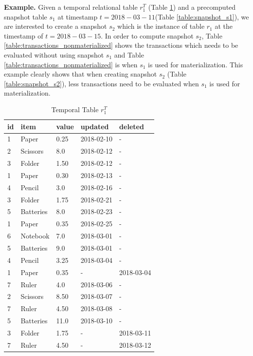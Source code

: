 \textbf{Example.} Given a temporal relational table $r_1^T$ (Table \ref{table:temporal_table_3}) and a precomputed snapshot table $s_1$ at timestamp $t = 2018-03-11$(Table \ref{table:snapshot_s1}), we are interested to create a snapshot $s_2$ which is the instance of table $r_1$ at the timestamp of $t = 2018-03-15$. In order to compute snapshot $s_2$, Table \ref{table:transactions_nonmaterialized} shows the transactions which needs to be evaluated without using snapshot $s_1$ and Table \ref{table:transactions_nonmaterialized} is when $s_1$ is used for materialization. This example clearly shows that when creating snapshot $s_2$ (Table \ref{table:snapshot_s2}), less transactions need to be evaluated when $s_1$ is used for materialization.

\begin{center}
\begin{table}
	\centering
	\caption{Temporal Table $r_1^T$}
	\label {table:temporal_table_3}
	\begin{tabular}{p{1cm}p{2cm}p{3cm}p{3cm}p{2cm}}
		\hline
		id & item & value  & updated  & deleted\\ \hline
		1 & Paper & 0.25  & 2018-02-10  &  - \\  
		2 & Scissors & 8.0  & 2018-02-12  &  - \\
		3 & Folder & 1.50  & 2018-02-12  &  - \\
		1 & Paper & 0.30  & 2018-02-13  &  - \\
		4 & Pencil & 3.0  & 2018-02-16  &  - \\
		3 & Folder & 1.75  & 2018-02-21  &  - \\
		5 & Batteries & 8.0  & 2018-02-23  &  - \\
		1 & Paper & 0.35  & 2018-02-25  &  - \\
		6 & Notebook & 7.0  & 2018-03-01  &  - \\
		5 & Batteries & 9.0  & 2018-03-01  &  - \\
		4 & Pencil & 3.25  & 2018-03-04  &  - \\
		1 & Paper & 0.35  &  - &  2018-03-04 \\
		7 & Ruler & 4.0  & 2018-03-06  &  - \\
		2 & Scissors & 8.50  & 2018-03-07  &  - \\
		7 & Ruler & 4.50  & 2018-03-08  &  -\\
		5 & Batteries & 11.0  & 2018-03-10 & - \\
		3 & Folder & 1.75  & - & 2018-03-11 \\
		7 & Ruler & 4.50  & -  &  2018-03-12 \\

\end{tabular}
\end{table}
\end{center}
